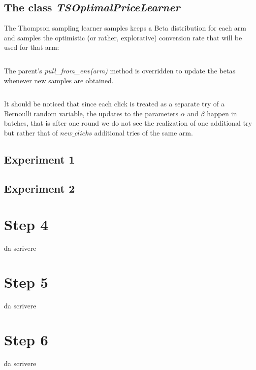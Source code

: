 \documentclass[11pt]{article} %
\begin{document}
\subsection{The class \textit{TSOptimalPriceLearner}}
The Thompson sampling learner samples keeps a Beta distribution for each arm and samples the optimistic (or rather, explorative) conversion rate that will be used for that arm:
\inputminted{python}{code/step3_ts_cr.py}
The parent's \textit{pull\_from\_env(arm)} method is overridden to update the betas whenever new samples are obtained.
\inputminted{python}{code/step3_ts_betas.py}
It should be noticed that since each click is treated as a separate try of a Bernoulli random variable, the updates to the parameters $\alpha$ and $\beta$ happen in batches, that is after one round we do not see the realization of one additional try but rather that of $new\_clicks$ additional tries of the same arm.

\clearpage
\subsection{Experiment 1}

\clearpage


\clearpage
\subsection{Experiment 2}

\clearpage


\clearpage
\section{Step 4}
{\color{red}da scrivere}


\clearpage
\section{Step 5}
{\color{red}da scrivere}


\clearpage
\section{Step 6}
{\color{red}da scrivere}
\end{document}
